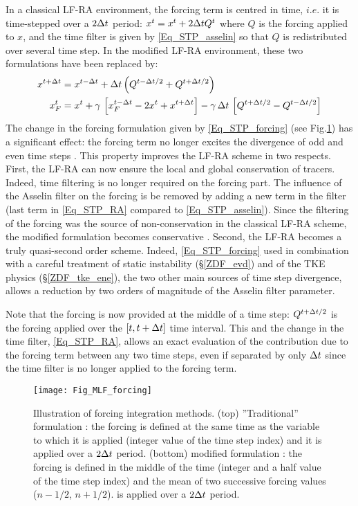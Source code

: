 \documentclass[NEMO_book]{subfiles}
\begin{document}
In a classical LF-RA environment, the forcing term is centred in time, $i.e.$ 
it is time-stepped over a $2\Delta t$ period:  $x^t  = x^t + 2\Delta t Q^t $ where $Q$ 
is the forcing applied to $x$, and the time filter is given by \eqref{Eq_STP_asselin} 
so that $Q$ is redistributed over several time step. 
In the modified LF-RA environment, these two formulations have been replaced by:
\begin{align} 
x^{t+\rdt}  &= x^{t-\rdt} + \rdt \left( Q^{t-\rdt/2} + Q^{t+\rdt/2} \right)                   \label{Eq_STP_forcing} \\
%
x_F^t  &= x^t + \gamma \, \left[ x_F^{t-\rdt} - 2 x^t + x^{t+\rdt} \right] 
           - \gamma\,\rdt \, \left[ Q^{t+\rdt/2} -  Q^{t-\rdt/2} \right]                          \label{Eq_STP_RA}
\end{align}
The change in the forcing formulation given by \eqref{Eq_STP_forcing} 
(see Fig.\ref{Fig_MLF_forcing}) has a significant effect: the forcing term no 
longer excites the divergence of odd and even time steps \citep{Leclair_Madec_OM09}. 
This property improves the LF-RA scheme in two respects. 
First, the LF-RA can now ensure the local and global conservation of tracers.
Indeed, time filtering is no longer required on the forcing part. The influence of 
the Asselin filter on the forcing is be removed by adding a new term in the filter
(last term in \eqref{Eq_STP_RA} compared to \eqref{Eq_STP_asselin}). Since 
the filtering of the forcing was the source of non-conservation in the classical 
LF-RA scheme, the modified formulation becomes conservative  \citep{Leclair_Madec_OM09}.
Second, the LF-RA becomes a truly quasi-second order scheme. Indeed, 
\eqref{Eq_STP_forcing} used in combination with a careful treatment of static 
instability (\S\ref{ZDF_evd}) and of the TKE physics (\S\ref{ZDF_tke_ene}),
the two other main sources of time step divergence, allows a reduction by 
two orders of magnitude of the Asselin filter parameter. 

Note that the forcing is now provided at the middle of a time step: $Q^{t+\Delta t/2}$ 
is the forcing applied over the $[t,t+\Delta t]$ time interval. This and the change 
in the time filter, \eqref{Eq_STP_RA}, allows an exact evaluation of the 
contribution due to the forcing term between any two time steps, 
even if separated by only $\Delta t$ since the time filter is no longer applied to the
forcing term.

\begin{figure}[!t] 	  \begin{center}
\texttt{[image: Fig\_MLF\_forcing]}
\caption{ 	\label{Fig_MLF_forcing}
Illustration of forcing integration methods. 
(top) ''Traditional'' formulation : the forcing is defined at the same time as the variable 
to which it is applied (integer value of the time step index) and it is applied over a $2\Delta t$ period. 
(bottom)  modified formulation : the forcing is defined in the middle of the time (integer and a half 
value of the time step index) and the mean of two successive forcing values ($n-1/2$, $n+1/2$).
is applied over a $2\Delta t$ period.}
\end{center}   \end{figure}
\end{document}
